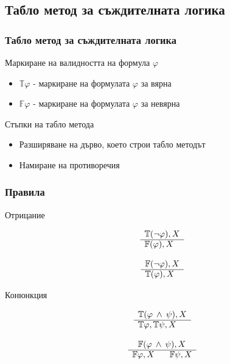 \documentclass{beamer}
\newcommand{\signT}{\mathbb{T}}
\newcommand{\signF}{\mathbb{F}}
\begin{document}
\subsection{Табло метод за съждителната логика}
\begin{frame}\frametitle{Табло метод за съждителната логика}
Маркиране на валидността на формула $\varphi$
\begin{itemize}
	\item $\signT \varphi$ - маркиране на формулата $\varphi$ за вярна
	\item $\signF \varphi$ - маркиране на формулата $\varphi$ за невярна
\end{itemize}
\vspace{20px}
Стъпки на табло метода
\begin{itemize}
	\item Разширяване на дърво, което строи табло методът
	\item Намиране на противоречия
\end{itemize}
\end{frame}

\begin{frame}\frametitle{Правила}
Отрицание
\vspace{20px}
		\noindent\begin{minipage}{.5\linewidth}
		\begin{align*}
			\begin{array}{rl}
				& \signT(\neg \varphi), X \\
				      \cline{2-2}
				      & \signF(\varphi), X
			\end{array}
		\end{align*}
		\end{minipage}%
		\begin{minipage}{.5\linewidth}
		\begin{align*}
			\begin{array}{rl}
				& \signF(\neg \varphi), X \\
			      \cline{2-2}
			      & \signT(\varphi), X
			\end{array}
		\end{align*}
		\end{minipage}
Конюнкция
		\noindent\begin{minipage}{.5\linewidth}
		\begin{align*}
			\begin{array}{rl}
				& \signT(\varphi \: \wedge \: \psi), X \\
			      \cline{2-2}
			      & \signT\varphi, \signT\psi, X
			\end{array}
		\end{align*}
		\end{minipage}%
		\begin{minipage}{.5\linewidth}
		\begin{align*}
			\begin{array}{rl}
				& \:\:\: \signF(\varphi \: \wedge \: \psi), X \\
			      \cline{2-2}
			      & \signF\varphi, X \:\:\:\:\:\:\:\: \signF\psi, X
			\end{array}
		\end{align*}
		\end{minipage}
\end{frame}
\end{document}
